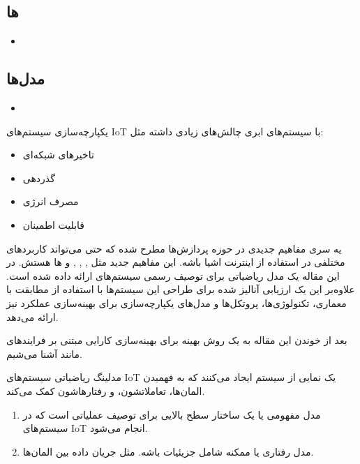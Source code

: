 \documentclass[a4paper]{article}
\begin{document}
\subsection{ها}

\begin{itemize}
    \item 
\end{itemize}

\subsection{مدل‌ها}

\begin{itemize}
    \item 
\end{itemize}

یکپارچه‌سازی سیستم‌های IoT با سیستم‌های ابری چالش‌های زیادی داشته مثل:

\begin{itemize}
    \item تاخیر‌های شبکه‌ای
    \item گذردهی
    \item مصرف انرژی
    \item قابلیت اطمینان
\end{itemize}

یه سری مفاهیم جدیدی در حوزه پردازش‌ها مطرح شده که حتی می‌تواند کاربرد‌های مختلفی
در استفاده از اینترنت اشیا باشه. این مفاهیم جدید مثل ,
, ,  و
 ‌ها هستش.  در این مقاله یک مدل ریاضیاتی برای توصیف رسمی سیستم‌های
 ارائه داده شده است.  علاوه‌بر این یک ارزیابی آنالیز شده برای طراحی این
سیستم‌ها با استفاده از مطابقت با معماری، تکنولوژی‌ها، پروتکل‌ها و مدل‌های
یکپارچه‌سازی برای بهینه‌سازی عملکرد نیز ارائه می‌دهد.


بعد از خوندن این مقاله به یک روش بهینه برای بهینه‌سازی کارایی مبتنی بر
فرایند‌های  مانند  آشنا می‌شیم.

مدلینگ ریاضیاتی سیستم‌های IoT یک نمایی از سیستم ایجاد می‌کنند که به فهمیدن
المان‌ها، تعاملاتشون، و رفتار‌هاشون کمک می‌کند.

\begin{enumerate}
    \item مدل مفهومی یا  یک ساختار سطح بالایی برای توصیف
    عملیاتی است که در سیستم‌های IoT انجام می‌شود.
    \item مدل رفتاری یا  ممکنه شامل جزیئیات باشه. مثل جریان
    داده بین المان‌ها.
\end{enumerate}
\end{document}
